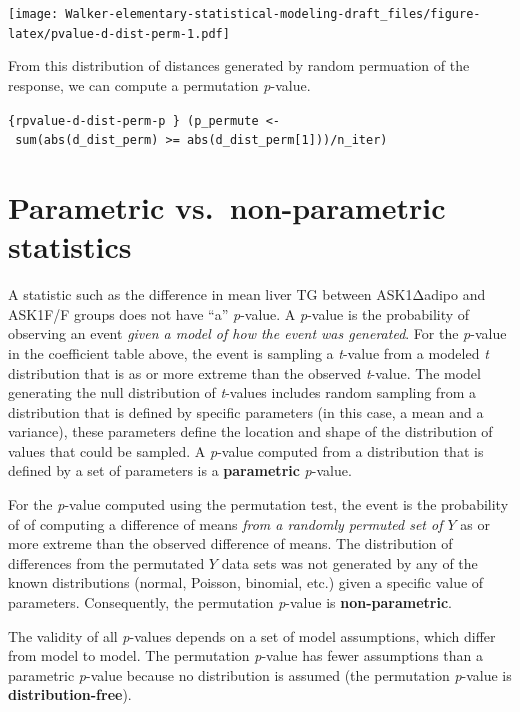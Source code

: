 \documentclass[]{book}
\begin{document}
\texttt{[image: Walker-elementary-statistical-modeling-draft\_files/figure-latex/pvalue-d-dist-perm-1.pdf]}

From this distribution of distances generated by random permuation of the response, we can compute a permutation \emph{p}-value.

\texttt{\{rpvalue-d-dist-perm-p\ \}\ (p\_permute\ \textless{}-\ sum(abs(d\_dist\_perm)\ \textgreater{}=\ abs(d\_dist\_perm{[}1{]}))/n\_iter)}

\hypertarget{parametric-vs.-non-parametric-statistics}{%
\section{Parametric vs.~non-parametric statistics}\label{parametric-vs.-non-parametric-statistics}}

A statistic such as the difference in mean liver TG between ASK1Δadipo and ASK1F/F groups does not have ``a'' \emph{p}-value. A \emph{p}-value is the probability of observing an event \emph{given a model of how the event was generated}. For the \emph{p}-value in the coefficient table above, the event is sampling a \emph{t}-value from a modeled \emph{t} distribution that is as or more extreme than the observed \emph{t}-value. The model generating the null distribution of \emph{t}-values includes random sampling from a distribution that is defined by specific parameters (in this case, a mean and a variance), these parameters define the location and shape of the distribution of values that could be sampled. A \emph{p}-value computed from a distribution that is defined by a set of parameters is a \textbf{parametric} \emph{p}-value.

For the \emph{p}-value computed using the permutation test, the event is the probability of of computing a difference of means \emph{from a randomly permuted set of \(Y\)} as or more extreme than the observed difference of means. The distribution of differences from the permutated \(Y\) data sets was not generated by any of the known distributions (normal, Poisson, binomial, etc.) given a specific value of parameters. Consequently, the permutation \emph{p}-value is \textbf{non-parametric}.

The validity of all \emph{p}-values depends on a set of model assumptions, which differ from model to model. The permutation \emph{p}-value has fewer assumptions than a parametric \emph{p}-value because no distribution is assumed (the permutation \emph{p}-value is \textbf{distribution-free}).
\end{document}
